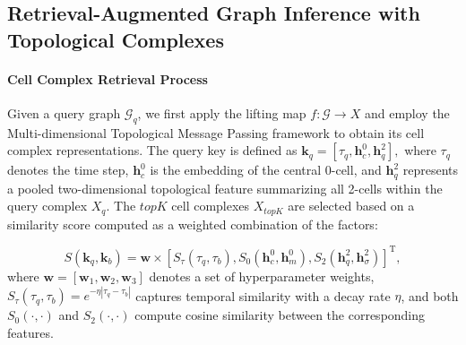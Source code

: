 










\subsection{Retrieval-Augmented Graph Inference with Topological Complexes}
\paragraph{Cell Complex Retrieval Process} Given a query graph $\mathcal{G}_q$, we first apply the lifting map $f: \mathcal{G} \to X$ and employ the Multi-dimensional Topological Message Passing framework to obtain its cell complex representations. The query key is defined as 
$
\bm{k}_q = [\tau_q, \bm{h}_c^0, \bm{h}_q^2],
$
where \(\tau_q\) denotes the time step, \(\bm{h}_c^0\) is the embedding of the central 0-cell, and \(\bm{h}_q^2\) represents a pooled two-dimensional topological feature summarizing all 2-cells within the query complex \(X_q\). The \(topK\) cell complexes $X_{topK}$ are selected based on a similarity score computed as a weighted combination of the factors:

\begin{equation}
S(\bm{k}_q, \bm{k}_b) = \mathbf{w} \times [S_{\tau}(\tau_q, \tau_b), S_{0}(\bm{h}^0_c, \bm{h}^0_m), S_{2}(\bm{h}^2_q, \bm{h}^2_{\sigma})]^\text{T},
\end{equation}
where $\mathbf{w} = [\mathbf{w}_1, \mathbf{w}_2, \mathbf{w}_3]$ denotes a set of hyperparameter weights,  
$S_{\tau}(\tau_q, \tau_b) = e^{-\eta |\tau_q - \tau_b|}$ captures temporal similarity with a decay rate $\eta$,  
and both $S_0(\cdot, \cdot)$ and $S_2(\cdot, \cdot)$ compute cosine similarity between the corresponding features. %

